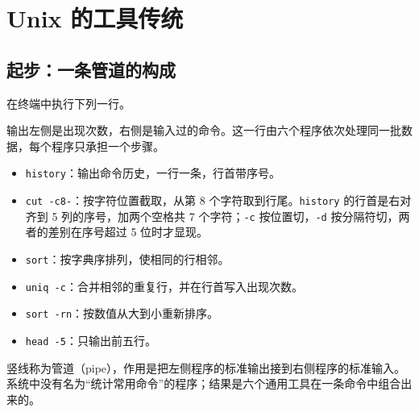 \chapter{Unix 的工具传统}
\label{ch:unix-culture}

\section{起步：一条管道的构成}

在终端中执行下列一行。


输出左侧是出现次数，右侧是输入过的命令。这一行由六个程序依次处理同一批数据，每个程序只承担一个步骤。

\begin{itemize}
  \item \texttt{history}：输出命令历史，一行一条，行首带序号。
  \item \texttt{cut -\allowbreak{}c8-}：按字符位置截取，从第 8 个字符取到行尾。\texttt{history} 的行首是右对齐到 5 列的序号，加两个空格共 7 个字符；\texttt{-c} 按位置切，\texttt{-d} 按分隔符切，两者的差别在序号超过 5 位时才显现。
  \item \texttt{sort}：按字典序排列，使相同的行相邻。
  \item \texttt{uniq -c}：合并相邻的重复行，并在行首写入出现次数。
  \item \texttt{sort -rn}：按数值从大到小重新排序。
  \item \texttt{head -5}：只输出前五行。
\end{itemize}

竖线称为管道（pipe），作用是把左侧程序的标准输出接到右侧程序的标准输入。系统中没有名为“统计常用命令”的程序；结果是六个通用工具在一条命令中组合出来的。

